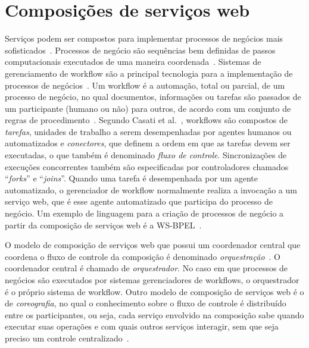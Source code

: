 \section{Composições de serviços web}
\label{sec:composicoes}

Serviços podem ser compostos para implementar processos de negócios mais sofisticados~\cite{Papazoglou2007State}. Processos de negócio são sequências bem definidas de passos computacionais executados de uma maneira coordenada~\cite{Alonso2002Atomicity}. Sistemas de gerenciamento de workflow são a principal tecnologia para a implementação de processos de negócios~\cite{Agostini2000Improving}.  Um workflow é a automação, total ou parcial, de um processo de negócio, no qual documentos, informações ou tarefas são passados de um participante (humano ou não) para outros, de acordo com um conjunto de regras de procedimento~\cite{WorkflowCoalition1999}. Segundo Casati et al.~\cite{Casati1998Workflow}, workflows são compostos de \emph{tarefas}, unidades de trabalho a serem desempenhadas por agentes humanos ou automatizados e \emph{conectores}, que definem a ordem em que as tarefas devem ser executadas, o que também é denominado \emph{fluxo de controle}. Sincronizações de execuções concorrentes também são especificadas por controladores chamados ``\emph{forks}'' e ``\emph{joins}''. Quando uma tarefa é desempenhada por um agente automatizado, o gerenciador de workflow normalmente realiza a invocação a um serviço web, que é esse agente automatizado que participa do processo de negócio. Um exemplo de linguagem para a criação de processos de negócio a partir da composição de serviços web é a WS-BPEL~\cite{BPEL2007}.

O modelo de composição de serviços web que possui um coordenador central que coordena o fluxo de controle da composição é denominado \emph{orquestração}~\cite{Nanda2004Decentralizing}. O coordenador central é chamado de \emph{orquestrador}. No caso em que processos de negócios são executados por sistemas gerenciadores de workflows, o orquestrador é o próprio sistema de workflow. Outro modelo de composição de serviços web é o de \emph{coreografia}, no qual o conhecimento sobre o fluxo de controle é distribuído entre os participantes, ou seja, cada serviço envolvido na composição sabe quando executar suas operações e com quais outros serviços interagir, sem que seja preciso um controle centralizado~\cite{Barker2009Choreographing}.


